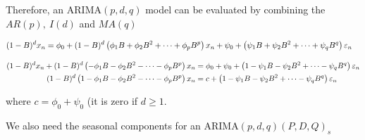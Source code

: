 Therefore, an ARIMA$(p,d,q)$ model can be evaluated by combining the $AR(p),\ I(d)$ and $MA(q)$

\begin{align}
(1-B)^d x_n
&= \phi_0+(1-B)^d\left(\phi_1 B+\phi_2 B^2 +\dots + \phi_p B^p\right)x_n +
\psi_0+\left(\psi_1 B+\psi_2 B^2 +\dots + \psi_q B^q\right)\varepsilon_n \nonumber 
\end{align}

\begin{align}
(1-B)^d x_n + (1-B)^d\left(-\phi_1 B-\phi_2 B^2 -\dots - \phi_p B^p\right)x_n
&= \phi_0 + \psi_0+\left(1-\psi_1 B-\psi_2 B^2 +\dots - \psi_q B^q\right)\varepsilon_n  \nonumber \\
(1-B)^d\left(1-\phi_1 B-\phi_2 B^2 -\dots - \phi_p B^p\right)x_n
&=c+\left(1-\psi_1 B-\psi_2 B^2 +\dots - \psi_q B^q\right)\varepsilon_n  \nonumber \\
\end{align}

where $c= \phi_0 + \psi_0$ (it is zero if $d\geq1$.

We also need the seasonal components for an ARIMA$(p,d,q)(P,D,Q)_s$ 

